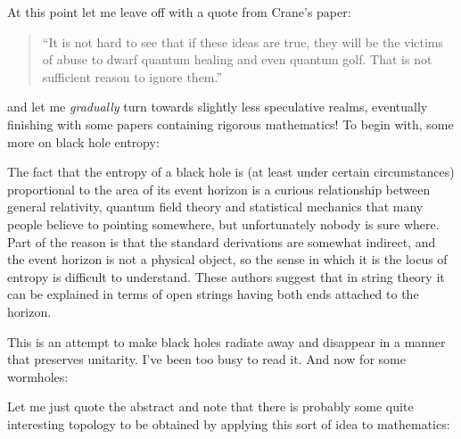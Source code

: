 \documentclass{article}
\def\tightlist{}
\renewcommand{\texttt}[1]{%
  \begingroup
  \ttfamily
  \begingroup\lccode`~=`/\lowercase{\endgroup\def~}{/\discretionary{}{}{}}%
  \begingroup\lccode`~=`[\lowercase{\endgroup\def~}{[\discretionary{}{}{}}%
  \begingroup\lccode`~=`.\lowercase{\endgroup\def~}{.\discretionary{}{}{}}%
  \catcode`/=\active\catcode`[=\active\catcode`.=\active
  \scantokens{#1\noexpand}%
  \endgroup
}
\begin{document}
At this point let me leave off with a quote from Crane's paper:

\begin{quote}
``It is not hard to see that if these ideas are true, they will be the
victims of abuse to dwarf quantum healing and even quantum golf. That is
not sufficient reason to ignore them.''
\end{quote}
\noindent
and let me \emph{gradually} turn towards slightly less speculative
realms, eventually finishing with some papers containing rigorous
mathematics! To begin with, some more on black hole entropy:

\noindent
The fact that the entropy of a black hole is (at least under certain
circumstances) proportional to the area of its event horizon is a
curious relationship between general relativity, quantum field theory
and statistical mechanics that many people believe to pointing
somewhere, but unfortunately nobody is sure where. Part of the reason is
that the standard derivations are somewhat indirect, and the event
horizon is not a physical object, so the sense in which it is the locus
of entropy is difficult to understand. These authors suggest that in
string theory it can be explained in terms of open strings having both
ends attached to the horizon.

\noindent
This is an attempt to make black holes radiate away and disappear in a
manner that preserves unitarity. I've been too busy to read it. And now
for some wormholes:

\noindent
Let me just quote the abstract and note that there is probably some
quite interesting topology to be obtained by applying this sort of idea
to mathematics:
\end{document}
